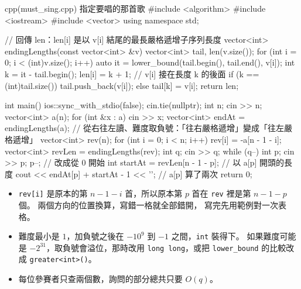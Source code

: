 \begin{example}[label=ex:ss-sing]{cpp}{(must\_sing.cpp) 指定要唱的那首歌}
#include <algorithm>
#include <iostream>
#include <vector>
using namespace std;

// 回傳 len：len[i] 是以 v[i] 結尾的最長嚴格遞增子序列長度
vector<int> endingLengths(const vector<int> &v) {
    vector<int> tail, len(v.size());
    for (int i = 0; i < (int)v.size(); i++) {
        auto it = lower_bound(tail.begin(), tail.end(), v[i]);
        int k = it - tail.begin();
        len[i] = k + 1;                 // v[i] 接在長度 k 的後面
        if (k == (int)tail.size()) {
            tail.push_back(v[i]);
        } else {
            tail[k] = v[i];
        }
    }
    return len;
}

int main() {
    ios::sync_with_stdio(false);
    cin.tie(nullptr);
    int n;
    cin >> n;
    vector<int> a(n);
    for (int &x : a) {
        cin >> x;
    }
    vector<int> endAt = endingLengths(a);
    // 從右往左讀、難度取負號：「往右嚴格遞增」變成「往左嚴格遞增」
    vector<int> rev(n);
    for (int i = 0; i < n; i++) {
        rev[i] = -a[n - 1 - i];
    }
    vector<int> revLen = endingLengths(rev);
    int q;
    cin >> q;
    while (q--) {
        int p;
        cin >> p;
        p--;                                    // 改成從 0 開始
        int startAt = revLen[n - 1 - p];   // 以 a[p] 開頭的長度
        cout << endAt[p] + startAt - 1 << '\n';   // a[p] 算了兩次
    }
    return 0;
}
\end{example}


\begin{itemize}
\item \texttt{rev[i]} 是原本的第 $n - 1 - i$ 首，所以原本第 $p$ 首在
\texttt{rev} 裡是第 $n - 1 - p$ 個。 兩個方向的位置換算，寫錯一格就全部錯開，
寫完先用範例對一次表格。
\item 難度最小是 $1$，加負號之後在 $-10^9$ 到 $-1$ 之間，\texttt{int} 裝得下。
如果難度可能是 $-2^{31}$，取負號會溢位，那時改用 \texttt{long long}，或把
\texttt{lower\_bound} 的比較改成 \texttt{greater<int>()}。
\item 每位參賽者只查兩個數，詢問的部分總共只要 $O(q)$。
\end{itemize}

